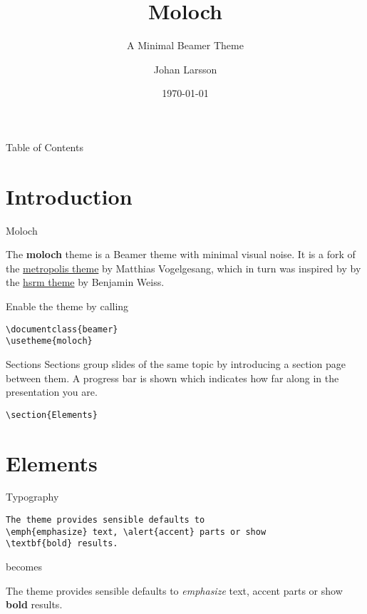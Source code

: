\documentclass[10pt]{beamer}
\title{Moloch}
\subtitle{A Minimal Beamer Theme}
\date{\today}
\author{Johan Larsson}
\institute{The Department of Statistics, Lund University}
\newcommand{\themename}{\textbf{moloch}\xspace}
\begin{document}
\maketitle

\begin{frame}{Table of Contents}
  \tableofcontents[hideallsubsections]
\end{frame}

\section{Introduction}

\begin{frame}[fragile]{Moloch}

  The \themename theme is a Beamer theme with minimal visual noise. It is a fork of the
  \href{https://github.com/matze/mtheme}{metropolis theme} by Matthias Vogelgesang, which in turn was inspired by
  by the \href{https://github.com/hsrmbeamertheme/hsrmbeamertheme}{hsrm theme} by Benjamin Weiss.

  Enable the theme by calling
  \begin{verbatim}\documentclass{beamer}
\usetheme{moloch}\end{verbatim}
\end{frame}
\begin{frame}[fragile]{Sections}
  Sections group slides of the same topic by introducing a section page between them. A progress bar is shown which indicates how far along in the presentation you are.

  \begin{verbatim}\section{Elements}\end{verbatim}
\end{frame}

\section{Elements}

\begin{frame}[fragile]{Typography}
  \begin{verbatim}The theme provides sensible defaults to
\emph{emphasize} text, \alert{accent} parts or show
\textbf{bold} results.\end{verbatim}
  \begin{center}
    becomes
  \end{center}
  The theme provides sensible defaults to \emph{emphasize} text,
  \alert{accent} parts or show \textbf{bold} results.
\end{frame}
\end{document}
